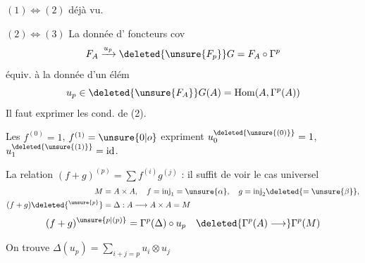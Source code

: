 
$(1)\Longleftrightarrow(2)$ déjà vu.

$(2)\Longleftrightarrow(3)$ La donnée d'
foncteurs cov
\[
F_A\xrightarrow{u_p}\deleted{\unsure{F_p}}G=F_A\circ\Gamma^p
\]
équiv. à la donnée d'un élém
\[
u_p\in\deleted{\unsure{F_A}}G(A)=\operatorname{Hom}(A,\Gamma^{p}(A))
\]
Il faut exprimer les cond. de (2).

Les  $f^{(0)}=1$, $f^{(1)}=\unsure{0|o}$ expriment
$u_0^{\deleted{\unsure{(0)}}}=1$, $u_1^{\deleted{\unsure{(1)}}}=\mathrm{id}$.

La relation $(f+g)^{(p)}=\sum f^{(i)}g^{(j)}$ : il
suffit de voir le cas universel
\[
\begin{aligned}
M&=A\times A,\quad f=\mathrm{inj}_{1}=\unsure{\alpha},\quad
g=\mathrm{inj}_{2}\deleted{=\unsure{\beta}},\\
(f+g)\deleted{{}^{\unsure{p}}}&=\Delta:A\longrightarrow A\times A=M
\end{aligned}
\]
\[
(f+g)^{\unsure{p|(p)}}=\Gamma^{p}(\Delta)\circ u_p\quad
\deleted{\Gamma^{p}(A)\longrightarrow}\Gamma^{p}(M)
\]


On trouve $\Delta(u_p)=\displaystyle\sum_{i+j=p}u_i\otimes u_j$
